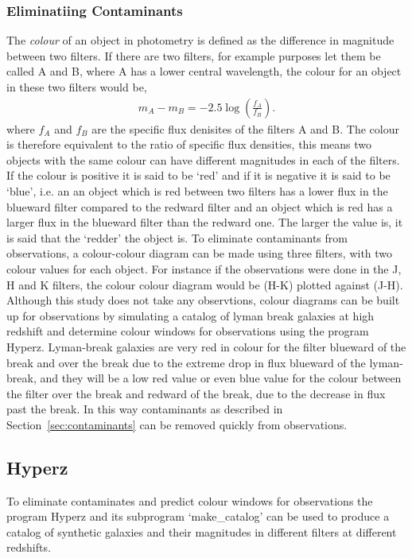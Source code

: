     	\subsubsection{Eliminatiing Contaminants} %
    	\label{sub:eliminatiing_contaminants}
			The \emph{colour} of an object in photometry is defined as the difference in magnitude between two filters\cite{Romanishin}. If there are two filters, for example purposes let them be called A and B, where A has a lower central wavelength, the colour for an object in these two filters would be,
			\begin{align}
				m_A-m_B=-2.5\log\left(\frac{f_A}{f_B}\right).
			\end{align}
			where $f_A$ and $f_B$ are the specific flux denisites of the filters A and B\cite{Romanishin}. The colour is therefore equivalent to the ratio of specific flux densities, this means two objects with the same colour can have different magnitudes in each of the filters. If the colour is positive it is said to be `red' and if it is negative it is said to be `blue', i.e. an an object which is red between two filters has a lower flux in the blueward filter compared to the redward filter and an object which is red has a larger flux in the blueward filter than the redward one.  The larger the value is, it is said that the `redder' the object is. To eliminate contaminants from observations, a colour-colour diagram can be made using three filters, with two colour values for each object. For instance if the observations were done in the J, H and K filters, the colour colour diagram would be (H-K) plotted against (J-H). Although this study does not take any observtions, colour diagrams can be built up for observations by simulating a catalog of lyman break galaxies at high redshift and determine colour windows for observations using the program Hyperz. Lyman-break galaxies are very red in colour for the filter blueward of the break and over the break due to the extreme drop in flux blueward of the lyman-break, and they will be a low red value or even blue value for the colour between the filter over the break and redward of the break, due to the decrease in flux past the break. In this way contaminants as described in Section~\ref{sec:contaminants} can be removed quickly from observations.

    \subsection{Hyperz} %
	\label{sub:Hyperz}
		To eliminate contaminates and predict colour windows for observations the program Hyperz and its subprogram `make\_catalog' can be used to produce a catalog of synthetic galaxies and their magnitudes in different filters at different redshifts.

